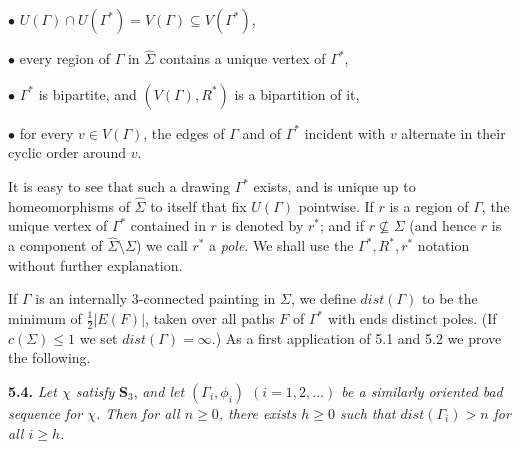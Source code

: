 \hspace*{12pt}$\bullet$ $U(\Gamma) \cap U(\Gamma^*) = V(\Gamma) \subseteq V(\Gamma^*)$,

\hspace*{12pt}$\bullet$ every region of $\Gamma$ in $\hat{\Sigma}$ contains a unique vertex of $\Gamma^*$,

\hspace*{12pt}$\bullet$ $\Gamma^*$ is bipartite, and $(V(\Gamma), R^*)$ is a bipartition of it,

\hspace*{12pt}$\bullet$ for every $v \in V(\Gamma)$, the edges of $\Gamma$ and of $\Gamma^*$ incident with $v$ alternate in their cyclic order around $v$.

It is easy to see that such a drawing $\Gamma^*$ exists, and is unique up to homeomorphisms of $\hat{\Sigma}$ to itself that fix $U(\Gamma)$ pointwise. If $r$ is a region of $\Gamma$, the unique vertex of $\Gamma^*$ contained in $r$ is denoted by $r^*$; and if $r \nsubseteq \Sigma$ (and hence $r$ is a component of $\hat{\Sigma} \setminus \Sigma$) we call $r^*$ a \textit{pole}. We shall use the $\Gamma^*, R^*, r^*$ notation without further explanation.

If $\Gamma$ is an internally 3-connected painting in $\Sigma$, we define $dist(\Gamma)$ to be the minimum of $\frac{1}{2}|E(F)|$, taken over all paths $F$ of $\Gamma^*$ with ends distinct poles. (If $c(\Sigma) \le 1$ we set $dist(\Gamma) = \infty$.) As a first application of 5.1 and 5.2 we prove the following.

\textbf{5.4.} \textit{Let $\chi$ satisfy} \textbf{S}$_3$, \textit{and let $(\Gamma_i, \phi_i)$ $(i = 1, 2, \dots)$ be a similarly oriented bad sequence for $\chi$. Then for all $n \ge 0$, there exists $h \ge 0$ such that $dist(\Gamma_i) > n$ for all $i \ge h$.}
